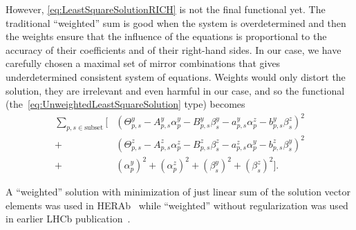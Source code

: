 However, \ref{eq:LeastSquareSolutionRICH} is not the final functional yet. The
traditional ``weighted'' sum is good when the system is overdetermined and then
the weights ensure that the influence of the equations is proportional to the
accuracy of their coefficients and of their right-hand sides. In our case, we
have carefully chosen a maximal set of mirror combinations that gives
underdetermined consistent system of equations. Weights would only distort the
solution, they are irrelevant and even harmful in our case, and so the
functional (the~\ref{eq:UnweightedLeastSquareSolution} type) becomes
\begin{equation}
  \label{eq:UnweightedLeastSquareSolutionRICH}
  \begin{aligned}
    \displaystyle\sum_{p,s \in \mathrm{subset}}
      \bigg[ 
             & (\varTheta^y_{p,s} - A^y_{p,s}\alpha^y_p
                                  - B^y_{p,s} \beta^y_s         
                                  - a^y_{p,s}\alpha^z_p         
                                  - b^y_{p,s} \beta^z_s)^2 \\
           + & (\varTheta^z_{p,s} - A^z_{p,s}\alpha^z_p
                                  - B^z_{p,s} \beta^z_s         
                                  - a^z_{p,s}\alpha^y_p         
                                  - b^z_{p,s} \beta^y_s)^2 \\
           + & (\alpha^y_p)^2
           +   (\alpha^z_p)^2
           +   ( \beta^y_s)^2
           +   ( \beta^z_s)^2
      \bigg]
      .
  \end{aligned}
\end{equation}

A ``weighted'' solution with minimization of just linear sum of the solution
vector elements was used in HERAb~\cite{Gorisek:1999td} while ``weighted''
without regularization was used in earlier LHCb
publication~\cite{Papanestis:2008zz}.

